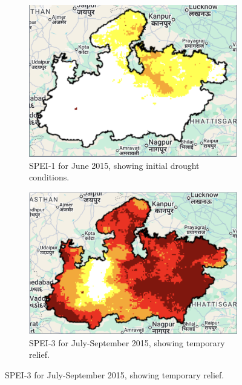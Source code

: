 \documentclass[12pt, a4paper]{article}
\begin{document}
\begin{figure}[h!]
    \centering
    \begin{subfigure}[b]{0.48\textwidth}
        \centering
        \includegraphics[width=\textwidth]{spei_june_2015.png}
        \caption{SPEI-1 for June 2015, showing initial drought conditions.}
        \label{fig:2015_jan}
    \end{subfigure}
    \hfill
    \begin{subfigure}[b]{0.48\textwidth}
        \centering
        \includegraphics[width=\textwidth]{spei_jul-sep_2015.png}
        \caption{SPEI-3 for July-September 2015, showing temporary relief.}
        \label{fig:2015_season3}
    \end{subfigure}
    
    \vspace{1cm} %
    

\end{figure}
\end{document}
